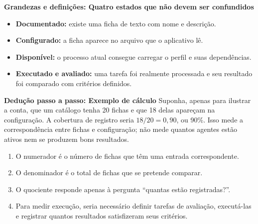 \begin{definicao}
\textbf{Grandezas e definições: Quatro estados que não devem ser confundidos}
\begin{itemize}[leftmargin=1.3em,itemsep=1pt]
  \item \textbf{Documentado:} existe uma ficha de texto com nome e descrição.
  \item \textbf{Configurado:} a ficha aparece no arquivo que o aplicativo lê.
  \item \textbf{Disponível:} o processo atual consegue carregar o perfil e suas
        dependências.
  \item \textbf{Executado e avaliado:} uma tarefa foi realmente processada e
        seu resultado foi comparado com critérios definidos.
\end{itemize}
\end{definicao}

\begin{metodo}
\textbf{Dedução passo a passo: Exemplo de cálculo}  Suponha, apenas para ilustrar a conta, que um
catálogo tenha 20 fichas e que 18 delas apareçam na configuração. A cobertura
de registro seria $18/20=0{,}90$, ou 90\%. Isso mede a correspondência entre
fichas e configuração; não mede quantos agentes estão ativos nem se produzem
bons resultados.
\begin{enumerate}[leftmargin=1.4em,itemsep=2pt]
  \item O numerador é o número de fichas que têm uma entrada correspondente.
  \item O denominador é o total de fichas que se pretende comparar.
  \item O quociente responde apenas à pergunta ``quantas estão registradas?''.
  \item Para medir execução, seria necessário definir tarefas de avaliação,
        executá-las e registrar quantos resultados satisfizeram seus critérios.
\end{enumerate}
\end{metodo}

